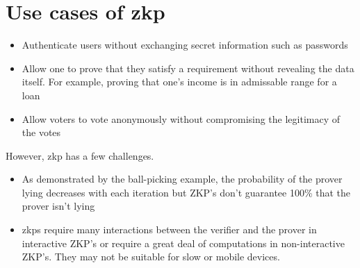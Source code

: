 \documentclass{article}
\begin{document}
\section*{Use cases of zkp}
\begin{itemize}
\item Authenticate users without exchanging secret information such as passwords
\item Allow one to prove that they satisfy a requirement without revealing the data itself. For example, proving that one's income is in admissable range for a loan
\item Allow voters to vote anonymously without compromising the legitimacy of the votes
\end{itemize}
However, zkp has a few challenges.
\begin{itemize}
\item As demonstrated by the ball-picking example, the probability of the prover lying decreases with each iteration but ZKP's don't guarantee 100\% that the prover isn't lying
\item zkps require many interactions between the verifier and the prover in interactive ZKP's or require a great deal of computations in non-interactive ZKP's. They may not be suitable for slow or mobile devices.
\end{itemize}

\clearpage %
\end{document}
